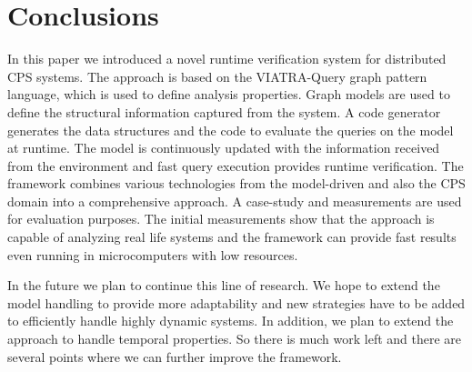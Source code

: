 
\chapter{Conclusions}
\label{sec:conclusion}

In this paper we introduced a novel runtime verification system for distributed CPS systems. The approach is based on the VIATRA-Query graph pattern language, which is used to define analysis properties. Graph models are used to define the structural information captured from the system. A code generator generates the data structures and the code to evaluate the queries on the model at runtime. The model is continuously updated with the information received from the environment and fast query execution provides runtime verification. 
The framework combines various technologies from the model-driven and also the CPS domain into a comprehensive approach. A case-study and measurements are used for evaluation purposes. 
The initial measurements show that the approach is capable of analyzing real life systems and the framework can provide fast results even running in microcomputers with low resources.

In the future we plan to continue this line of research. We hope to extend the model handling to provide more adaptability and new strategies have to be added to efficiently handle highly dynamic systems. In addition, we plan to extend the approach to handle temporal properties.
So there is much work left and there are several points where we can further improve the framework. 